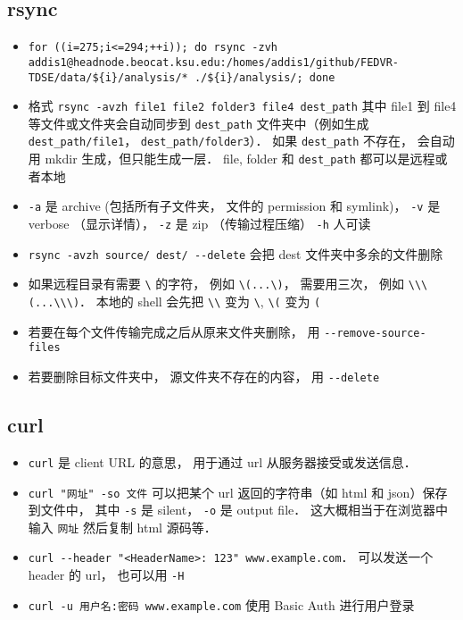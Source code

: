\subsection{rsync}
\begin{itemize}
\item \verb|for ((i=275;i<=294;++i)); do rsync -zvh addis1@headnode.beocat.ksu.edu:/homes/addis1/github/FEDVR-TDSE/data/${i}/analysis/* ./${i}/analysis/; done|
\item 格式 \verb`rsync -avzh file1 file2 folder3 file4 dest_path` 其中 file1 到 file4 等文件或文件夹会自动同步到 \verb|dest_path| 文件夹中（例如生成 \verb`dest_path/file1`， \verb`dest_path/folder3`）． 如果 \verb|dest_path| 不存在， 会自动用 mkdir 生成，但只能生成一层． file, folder 和 \verb|dest_path| 都可以是远程或者本地
\item \verb`-a` 是 archive (包括所有子文件夹， 文件的 permission 和 symlink)， \verb`-v` 是 verbose （显示详情）， \verb`-z` 是 zip （传输过程压缩） \verb`-h` 人可读
\item \verb`rsync -avzh source/ dest/ --delete` 会把 dest 文件夹中多余的文件删除
\item 如果远程目录有需要 \verb`\` 的字符， 例如 \verb`\(...\)`， 需要用三次， 例如 \verb`\\\(...\\\)`． 本地的 shell 会先把 \verb`\\` 变为 \verb`\`, \verb`\(` 变为 \verb`(`
\item 若要在每个文件传输完成之后从原来文件夹删除， 用 \verb`--remove-source-files`
\item 若要删除目标文件夹中， 源文件夹不存在的内容， 用 \verb`--delete`
\end{itemize}

\subsection{curl}
\begin{itemize}
\item \verb|curl| 是 client URL 的意思， 用于通过 url 从服务器接受或发送信息．
\item \verb|curl "网址" -so 文件| 可以把某个 url 返回的字符串（如 html 和 json）保存到文件中， 其中 \verb|-s| 是 silent， \verb|-o| 是 output file． 这大概相当于在浏览器中输入 \verb|网址| 然后复制 html 源码等．
\item \verb|curl --header "<HeaderName>: 123" www.example.com|． 可以发送一个 header 的 url， 也可以用 \verb|-H|
\item \verb|curl -u 用户名:密码 www.example.com| 使用 Basic Auth 进行用户登录
\end{itemize}

